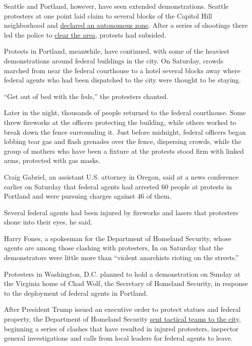 Seattle and Portland, however, have seen extended demonstrations.
Seattle protesters at one point laid claim to several blocks of the
Capitol Hill neighborhood and
\href{https://www.nytimes3xbfgragh.onion/2020/06/11/us/seattle-autonomous-zone.html}{declared
an autonomous zone}. After a series of shootings there led the police to
\href{https://www.nytimes3xbfgragh.onion/2020/07/01/us/seattle-protest-zone-CHOP-CHAZ-unrest.html}{clear
the area}, protests had subsided.

Protests in Portland, meanwhile, have continued, with some of the
heaviest demonstrations around federal buildings in the city. On
Saturday, crowds marched from near the federal courthouse to a hotel
several blocks away where federal agents who had been dispatched to the
city were thought to be staying.

``Get out of bed with the feds,'' the protesters chanted.

Later in the night, thousands of people returned to the federal
courthouse. Some threw fireworks at the officers protecting the
building, while others worked to break down the fence surrounding it.
Just before midnight, federal officers began lobbing tear gas and flash
grenades over the fence, dispersing crowds, while the group of mothers
who have been a fixture at the protests stood firm with linked arms,
protected with gas masks.

Craig Gabriel, an assistant U.S. attorney in Oregon, said at a news
conference earlier on Saturday that federal agents had arrested 60
people at protests in Portland and were pursuing charges against 46 of
them.

Several federal agents had been injured by fireworks and lasers that
protesters shone into their eyes, he said.

Harry Fones, a spokesman for the Department of Homeland Security, whose
agents are among those clashing with protesters, In on Saturday that the
demonstrators were little more than ``violent anarchists rioting on the
streets.''

Protesters in Washington, D.C. planned to hold a demonstration on Sunday
at the Virginia home of Chad Wolf, the Secretary of Homeland Security,
in response to the deployment of federal agents in Portland.

After President Trump issued an executive order to protect statues and
federal property, the Department of Homeland Security
\href{https://www.nytimes3xbfgragh.onion/2020/07/25/us/portland-federal-legal-jurisdiction-courts.html}{sent
tactical teams to the city}, beginning a series of clashes that have
resulted in injured protesters, inspector general investigations and
calls from local leaders for federal agents to leave.

